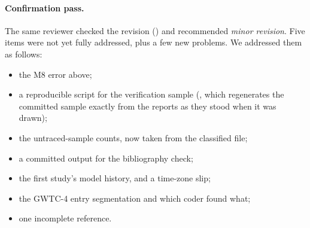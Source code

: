\paragraph{Confirmation pass.} The same reviewer checked the revision () and
recommended \emph{minor revision}. Five items were not yet fully addressed, plus a few new problems. We addressed them
as follows:
\begin{itemize}
\item the M8 error above;
\item a reproducible script for the verification sample (, which regenerates the
committed sample exactly from the reports as they stood when it was drawn);
\item the untraced-sample counts, now taken from the classified file;
\item a committed output for the bibliography check;
\item the first study's model history, and a time-zone slip;
\item the GWTC-4 entry segmentation and which coder found what;
\item one incomplete reference.
\end{itemize}
